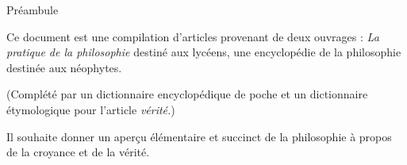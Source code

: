 
\thispagestyle{empty}

\begin{center}
\Large
Préambule
\normalsize
\end{center}
\vspace{3cm}

Ce document est une compilation d'articles provenant de deux
ouvrages : {\it La pratique de la philosophie} destiné aux
lycéens, une encyclopédie de la philosophie destinée aux néophytes.

(Complété par un dictionnaire encyclopédique de poche et un
dictionnaire étymologique pour l'article {\it vérité.})

Il souhaite donner un aperçu élémentaire et succinct de la
philosophie à propos de la croyance et de la vérité.

\vfill

